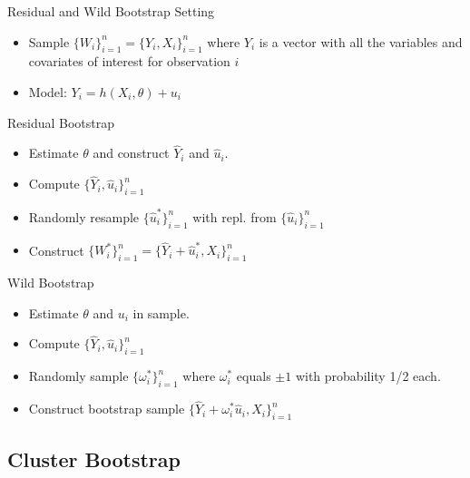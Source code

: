 \documentclass[aspectratio=169, handout]{beamer}
\begin{document}
{\footnotesize
\begin{frame}{Residual and Wild Bootstrap}
Setting
\vspace{-7pt}
\begin{itemize}
  \item \alert{Sample $\{W_i\}_{i=1}^n=\{Y_i,X_i\}_{i=1}^n$} where $Y_i$
    is a vector with all the variables and covariates of interest for
    observation $i$
  \item Model:
    $Y_i = h(X_i,\theta) + u_i$
\end{itemize}
\vspace{-7pt}
\alert{Residual Bootstrap}
\vspace{-7pt}
\begin{itemize}
  \item Estimate $\theta$ and construct $\hat{Y}_i$ and
    $\hat{u}_i$.
  \item Compute $\{\hat{Y}_i,\hat{u}_i\}_{i=1}^n$
  \item Randomly resample $\{\hat{u}_i^*\}_{i=1}^n$ with repl.
    from $\{\hat{u}_i\}_{i=1}^n$
  \item Construct
    $\{W_i^*\}_{i=1}^n=\{\hat{Y}_i+\hat{u}_i^*,X_i\}_{i=1}^n$
\end{itemize}
\vspace{-7pt}
\alert{Wild Bootstrap}
\vspace{-7pt}
\begin{itemize}
  \item Estimate $\theta$ and $u_i$ in sample.
  \item Compute $\{\hat{Y}_i,\hat{u}_i\}_{i=1}^n$
  \item Randomly sample $\{\omega_i^*\}_{i=1}^n$
    where $\omega_i^*$ equals $\pm 1$ with probability 1/2 each.
  \item Construct bootstrap sample
    $\{\hat{Y}_i+\omega_i^*\hat{u}_i,X_i\}_{i=1}^n$
\end{itemize}
\end{frame}
}

\subsection{Cluster Bootstrap}
\end{document}
